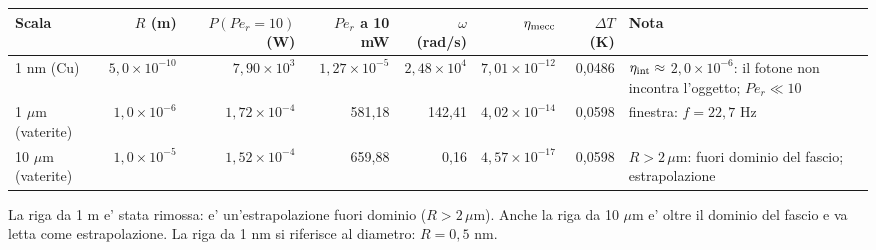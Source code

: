 \begingroup\scriptsize\setlength{\tabcolsep}{1.5pt}
\begin{tabular}{@{}lrrrrrrp{2.8cm}@{}}
\hline
Scala & $R$ (m) & $P(Pe_r{=}10)$ (W) & $Pe_r$ a 10 mW & $\omega$ (rad/s) & $\eta_{\rm mecc}$ & $\Delta T$ (K) & Nota \\
\hline
1 nm (Cu) & $5{,}0\times10^{-10}$ & $7{,}90\times10^{3}$ & $1{,}27\times10^{-5}$ & $2{,}48\times10^{4}$ & $7{,}01\times10^{-12}$ & 0{,}0486 & $\eta_{\rm int}\approx$ $2{,}0\times10^{-6}$: il fotone non incontra l'oggetto; $Pe_r\ll10$ \\
1 $\mu$m (vaterite) & $1{,}0\times10^{-6}$ & $1{,}72\times10^{-4}$ & 581{,}18 & 142{,}41 & $4{,}02\times10^{-14}$ & 0{,}0598 & finestra: $f=22{,}7$ Hz \\
10 $\mu$m (vaterite) & $1{,}0\times10^{-5}$ & $1{,}52\times10^{-4}$ & 659{,}88 & 0{,}16 & $4{,}57\times10^{-17}$ & 0{,}0598 & $R>2\,\mu$m: fuori dominio del fascio; estrapolazione \\
\hline
\end{tabular}
\endgroup

\par\smallskip\noindent\footnotesize La riga da 1 m e' stata rimossa: e' un'estrapolazione fuori dominio ($R>2\,\mu$m). Anche la riga da 10 $\mu$m e' oltre il dominio del fascio e va letta come estrapolazione. La riga da 1 nm si riferisce al diametro: $R=0{,}5$ nm.
